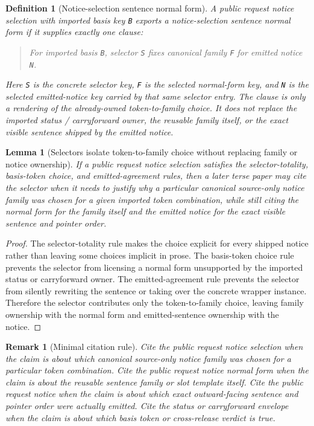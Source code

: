 \documentclass[11pt]{article}
\newtheorem{definition}{Definition}
\newtheorem{lemma}{Lemma}
\newtheorem{remark}{Remark}
\begin{document}
\begin{definition}[Notice-selection sentence normal form]
A public request notice selection with imported basis key \texttt{B} exports a \emph{notice-selection sentence normal form} if it supplies exactly one clause:
\begin{quote}\small
For imported basis \texttt{B}, selector \texttt{S} fixes canonical family \texttt{F} for emitted notice \texttt{N}.
\end{quote}
Here \texttt{S} is the concrete selector key, \texttt{F} is the selected normal-form key, and \texttt{N} is the selected emitted-notice key carried by that same selector entry. The clause is only a rendering of the already-owned token-to-family choice. It does not replace the imported status / carryforward owner, the reusable family itself, or the exact visible sentence shipped by the emitted notice.
\end{definition}

\begin{lemma}[Selectors isolate token-to-family choice without replacing family or notice ownership]
If a public request notice selection satisfies the selector-totality, basis-token choice, and emitted-agreement rules, then a later terse paper may cite the selector when it needs to justify why a particular canonical source-only notice family was chosen for a given imported token combination, while still citing the normal form for the family itself and the emitted notice for the exact visible sentence and pointer order.
\end{lemma}

\begin{proof}
The selector-totality rule makes the choice explicit for every shipped notice rather than leaving some choices implicit in prose.
The basis-token choice rule prevents the selector from licensing a normal form unsupported by the imported status or carryforward owner.
The emitted-agreement rule prevents the selector from silently rewriting the sentence or taking over the concrete wrapper instance.
Therefore the selector contributes only the token-to-family choice, leaving family ownership with the normal form and emitted-sentence ownership with the notice.\qedhere
\end{proof}

\begin{remark}[Minimal citation rule]
Cite the public request notice selection when the claim is about \emph{which canonical source-only notice family was chosen for a particular token combination}.
Cite the public request notice normal form when the claim is about \emph{the reusable sentence family or slot template itself}.
Cite the public request notice when the claim is about \emph{which exact outward-facing sentence and pointer order were actually emitted}.
Cite the status or carryforward envelope when the claim is about \emph{which basis token or cross-release verdict is true}.
\end{remark}
\end{document}
